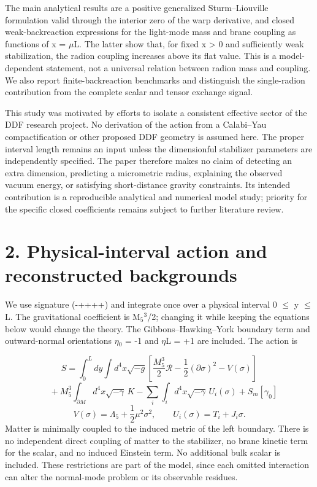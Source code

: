 \documentclass[11pt]{article}
\begin{document}
The main analytical results are a positive generalized Sturm--Liouville formulation valid through the interior zero of the warp derivative, and closed weak-backreaction expressions for the light-mode mass and brane coupling as functions of x = \(\mu\)L. The latter show that, for fixed x > 0 and sufficiently weak stabilization, the radion coupling increases above its flat value. This is a model-dependent statement, not a universal relation between radion mass and coupling. We also report finite-backreaction benchmarks and distinguish the single-radion contribution from the complete scalar and tensor exchange signal.

This study was motivated by efforts to isolate a consistent effective sector of the DDF research project. No derivation of the action from a Calabi--Yau compactification or other proposed DDF geometry is assumed here. The proper interval length remains an input unless the dimensionful stabilizer parameters are independently specified. The paper therefore makes no claim of detecting an extra dimension, predicting a micrometric radius, explaining the observed vacuum energy, or satisfying short-distance gravity constraints. Its intended contribution is a reproducible analytical and numerical model study; priority for the specific closed coefficients remains subject to further literature review.

\section*{2. Physical-interval action and reconstructed backgrounds}
We use signature (-++++) and integrate once over a physical interval 0 \(\leq\) y \(\leq\) L. The gravitational coefficient is M\({}_5\)\({}^3\)/2; changing it while keeping the equations below would change the theory. The Gibbons--Hawking--York boundary term and outward-normal orientations \(\eta\)\({}_0\) = -1 and \(\eta\)L = +1 are included. The action is

\begin{equation}
S=\int_0^L dy\int d^4x\sqrt{-g}\left[\frac{M_5^3}{2}\mathcal{R}-\frac{1}{2}(\partial\sigma)^2-V(\sigma)\right]\tag{1a}
\end{equation}
\begin{equation}
\quad+M_5^3\int_{\partial M}d^4x\sqrt{-\gamma}\,K-\sum_i\int_i d^4x\sqrt{-\gamma}\,U_i(\sigma)+S_m[\gamma_0]\tag{1b}
\end{equation}
\begin{equation}
V(\sigma)=\Lambda_5+\frac{1}{2}\mu^2\sigma^2,\qquad U_i(\sigma)=T_i+J_i\sigma.\tag{2}
\end{equation}
Matter is minimally coupled to the induced metric of the left boundary. There is no independent direct coupling of matter to the stabilizer, no brane kinetic term for the scalar, and no induced Einstein term. No additional bulk scalar is included. These restrictions are part of the model, since each omitted interaction can alter the normal-mode problem or its observable residues.
\end{document}
